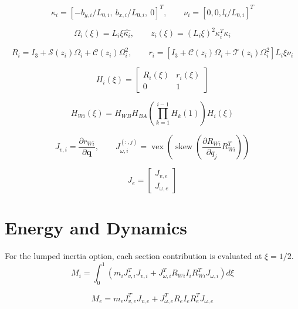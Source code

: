\documentclass[11pt]{article}
\newcommand{\Sfun}{\mathcal{S}}
\newcommand{\Cfun}{\mathcal{C}}
\newcommand{\Tfun}{\mathcal{T}}
\begin{document}
\begin{equation}
\kappa_i=[-b_{y,i}/L_{0,i},\ b_{x,i}/L_{0,i},\ 0]^T,\qquad\nu_i=[0,0,l_i/L_{0,i}]^T
\end{equation}

\begin{equation}
\Omega_i(\xi)=L_i\xi\widehat{\kappa_i},\qquad z_i(\xi)=(L_i\xi)^2\kappa_i^T\kappa_i
\end{equation}

\begin{equation}
R_i=I_3+\Sfun(z_i)\Omega_i+\Cfun(z_i)\Omega_i^2,\qquad r_i=\left[I_3+\Cfun(z_i)\Omega_i+\Tfun(z_i)\Omega_i^2\right]L_i\xi\nu_i
\end{equation}

\begin{equation}
H_i(\xi)=\begin{bmatrix}R_i(\xi)&r_i(\xi)\\0&1\end{bmatrix}\label{eq:local-transform}
\end{equation}

\begin{equation}
H_{Wi}(\xi)=H_{WB}H_{BA}\left(\prod_{k=1}^{i-1}H_k(1)\right)H_i(\xi)
\end{equation}

\begin{equation}
J_{v,i}=\frac{\partial r_{Wi}}{\partial\boldsymbol q},\qquad J_{\omega,i}^{(:,j)}=\operatorname{vex}\!\left(\operatorname{skew}\!\left(\frac{\partial R_{Wi}}{\partial q_j}R_{Wi}^{T}\right)\right)
\end{equation}

\begin{equation}
J_e=\begin{bmatrix}J_{v,e}\\J_{\omega,e}\end{bmatrix}
\end{equation}


\section{Energy and Dynamics}
For the lumped inertia option, each section contribution is evaluated at $\xi=1/2$.
\begin{equation}
M_i=\int_0^1\!\left(m_iJ_{v,i}^{T}J_{v,i}+J_{\omega,i}^{T}R_{Wi}I_iR_{Wi}^{T}J_{\omega,i}\right)d\xi
\end{equation}

\begin{equation}
M_e=m_eJ_{v,e}^{T}J_{v,e}+J_{\omega,e}^{T}R_eI_eR_e^TJ_{\omega,e}
\end{equation}
\end{document}
